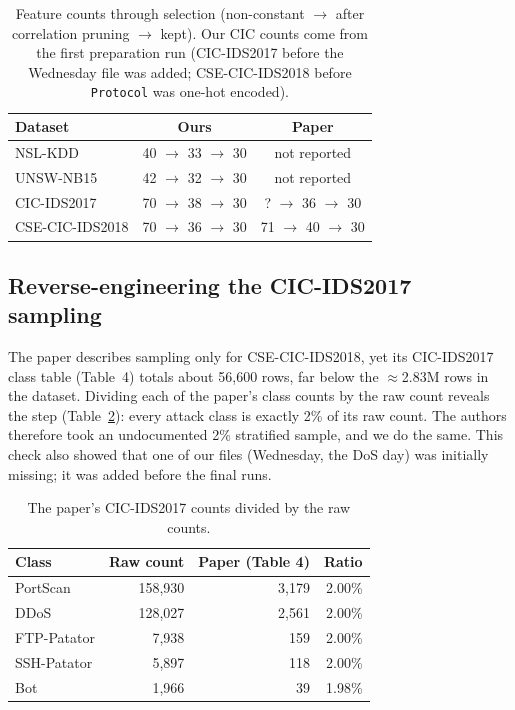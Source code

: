 \documentclass[11pt,a4paper]{article}
\begin{document}
\begin{table}[H]
\centering
\caption{Feature counts through selection (non-constant $\rightarrow$ after correlation pruning $\rightarrow$ kept).
Our CIC counts come from the first preparation run (CIC-IDS2017 before the Wednesday file was added;
CSE-CIC-IDS2018 before \texttt{Protocol} was one-hot encoded).}
\label{tab:fs}
\small
\begin{tabular}{lcc}
\toprule
Dataset & Ours & Paper \\
\midrule
NSL-KDD         & 40 $\rightarrow$ 33 $\rightarrow$ 30 & not reported \\
UNSW-NB15       & 42 $\rightarrow$ 32 $\rightarrow$ 30 & not reported \\
CIC-IDS2017     & 70 $\rightarrow$ 38 $\rightarrow$ 30 & ? $\rightarrow$ 36 $\rightarrow$ 30 \\
CSE-CIC-IDS2018 & 70 $\rightarrow$ 36 $\rightarrow$ 30 & 71 $\rightarrow$ 40 $\rightarrow$ 30 \\
\bottomrule
\end{tabular}
\end{table}

\subsection{Reverse-engineering the CIC-IDS2017 sampling}
\label{sec:sampling}
The paper describes sampling only for CSE-CIC-IDS2018, yet its CIC-IDS2017 class table (Table~4) totals about
56{,}600 rows, far below the $\approx$2.83M rows in the dataset. Dividing each of the paper's class counts by the
raw count reveals the step (Table~\ref{tab:sampling}): every attack class is exactly 2\% of its raw count.
The authors therefore took an undocumented 2\% stratified sample, and we do the same. This check also showed that
one of our files (Wednesday, the DoS day) was initially missing; it was added before the final runs.

\begin{table}[H]
\centering
\caption{The paper's CIC-IDS2017 counts divided by the raw counts.}
\label{tab:sampling}
\small
\begin{tabular}{lrrr}
\toprule
Class & Raw count & Paper (Table 4) & Ratio \\
\midrule
PortScan    & 158{,}930 & 3{,}179 & 2.00\% \\
DDoS        & 128{,}027 & 2{,}561 & 2.00\% \\
FTP-Patator & 7{,}938   & 159     & 2.00\% \\
SSH-Patator & 5{,}897   & 118     & 2.00\% \\
Bot         & 1{,}966   & 39      & 1.98\% \\
\bottomrule
\end{tabular}
\end{table}
\end{document}
